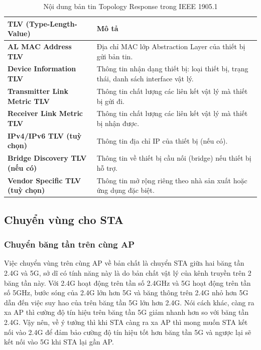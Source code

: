 \begin{table}[ht]
    \centering
    \caption{Nội dung bản tin Topology Response trong IEEE 1905.1}
    \begin{tabular}{|>{\raggedright\arraybackslash}m{5cm}|>{\raggedright\arraybackslash}m{8cm}|}
    \hline
    \textbf{TLV (Type-Length-Value)} & \textbf{Mô tả} \\
    \hline
    \textbf{AL MAC Address TLV} & Địa chỉ MAC lớp Abstraction Layer của thiết bị gửi bản tin. \\
    \hline
    \textbf{Device Information TLV} & Thông tin nhận dạng thiết bị: loại thiết bị, trạng thái, danh sách interface vật lý. \\
    \hline
    \textbf{Transmitter Link Metric TLV} & Thông tin chất lượng các liên kết vật lý mà thiết bị gửi đi. \\
    \hline
    \textbf{Receiver Link Metric TLV} & Thông tin chất lượng các liên kết vật lý mà thiết bị nhận được. \\
    \hline
    \textbf{IPv4/IPv6 TLV (tuỳ chọn)} & Thông tin địa chỉ IP của thiết bị (nếu có). \\
    \hline
    \textbf{Bridge Discovery TLV (nếu có)} & Thông tin về thiết bị cầu nối (bridge) nếu thiết bị hỗ trợ. \\
    \hline
    \textbf{Vendor Specific TLV (tuỳ chọn)} & Thông tin mở rộng riêng theo nhà sản xuất hoặc ứng dụng đặc biệt. \\
    \hline
    \end{tabular}
\end{table}
    
\subsection{ Chuyển vùng cho STA }
\subsubsection{ Chuyển băng tần trên cùng AP }
Việc chuyển vùng trên cùng AP về bản chất là chuyển STA giữa hai băng tần 2.4G và 5G, sở dĩ có tính năng này là do bản chất vật lý của kênh truyền trên 2 băng tần này. Với 2.4G hoạt động trên tần số 2.4GHz và 5G hoạt động trên tần số 5GHz, bước sóng của 2.4G lớn hơn 5G và băng thông trên 2.4G nhỏ hơn 5G dẫn đến việc suy hao của trên băng tần 5G lớn hơn 2.4G. Nói cách khác, càng ra xa AP thì cường độ tín hiệu trên băng tần 5G giảm nhanh hơn so với băng tần 2.4G. Vậy nên, về ý tưởng thì khi STA càng ra xa AP thì mong muốn STA kết nối vào 2.4G để đảm bảo cường độ tín hiệu tốt hơn băng tần 5G và ngược lại sẽ kết nối vào 5G khi STA lại gần AP. 

